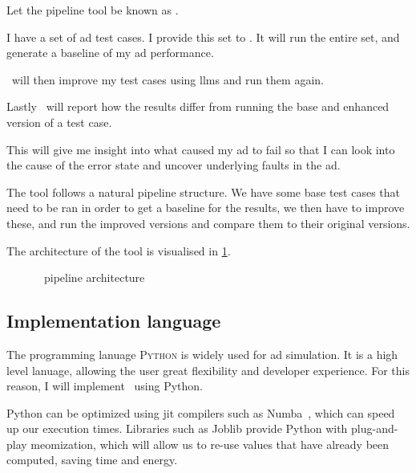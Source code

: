 
Let the pipeline tool be known as \hefe.


\begin{tcolorbox}[colback=gray!5!white,colframe=gray!75!black,title=User history
        of using \hefe]\label{user-history}
    I have a set of \acrfull{ad} test cases. I provide this set to \hefe. It will run the entire
    set, and generate a baseline of my \acrshort{ad} performance.

    \hefe~will then improve my test cases using \acrlong{llms} and run them again.

    Lastly \hefe~will report how the results differ from running the base and enhanced version of a
    test case.

    This will give me insight into what caused my \acrshort{ad} to fail so that I can look into the
    cause of the error state and uncover underlying faults in the \acrlong{ad}.

\end{tcolorbox}


The tool follows a natural pipeline structure. We have some base test cases that
need to be ran in order to get a baseline for the results, we then have to
improve these, and run the improved versions and compare them to their original
versions.

The architecture of the tool is visualised in \cref{fig:hefeArch}.

\begin{figure}[h]
    \centering
    
    \caption{\hefe~pipeline architecture}\label{fig:hefeArch}
\end{figure}

\subsection{Implementation language}

The programming lanuage \textsc{Python} is widely used for \acrfull{ad} simulation. It is a high
level lanuage, allowing the user great flexibility and developer experience. For this reason, I will
implement \hefe~using Python.

Python can be optimized using \acrfull{jit} compilers such as Numba~\cite{numba}, which can speed up
our execution times. Libraries such as Joblib provide Python with plug-and-play
meomization, which will allow us to re-use values that have already been
computed, saving time and energy.

